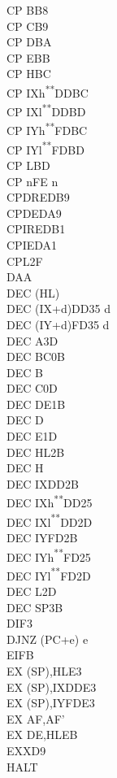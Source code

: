 \documentclass[twoside,openright,a4paper]{book}
\newcommand{\UNDOC}{\textnormal{\textsuperscript{**}}}
\begin{document}
\begin{multicols}{3}
{\begin{tabbing}
	CP B\>B8\\
	CP C\>B9\\
	CP D\>BA\\
	CP E\>BB\\
	CP H\>BC\\
	CP IXh\UNDOC\>DDBC\\
	CP IXl\UNDOC\>DDBD\\
	CP IYh\UNDOC\>FDBC\\
	CP IYl\UNDOC\>FDBD\\
	CP L\>BD\\
	CP n\>FE n\\
	CPDR\>EDB9\\
	CPD\>EDA9\\
	CPIR\>EDB1\\
	CPI\>EDA1\\
	CPL\>2F\\
	DAA\\
	DEC (HL)\\
	DEC (IX+d)\>DD35 d\\
	DEC (IY+d)\>FD35 d\\
	DEC A\>3D\\
	DEC BC\>0B\\
	DEC B\\
	DEC C\>0D\\
	DEC DE\>1B\\
	DEC D\\
	DEC E\>1D\\
	DEC HL\>2B\\
	DEC H\\
	DEC IX\>DD2B\\
	DEC IXh\UNDOC\>DD25\\
	DEC IXl\UNDOC\>DD2D\\
	DEC IY\>FD2B\\
	DEC IYh\UNDOC\>FD25\\
	DEC IYl\UNDOC\>FD2D\\
	DEC L\>2D\\
	DEC SP\>3B\\
	DI\>F3\\
	DJNZ (PC+e) e\\
	EI\>FB\\
	EX (SP),HL\>E3\\
	EX (SP),IX\>DDE3\\
	EX (SP),IY\>FDE3\\
	EX AF,AF'\\
	EX DE,HL\>EB\\
	EXX\>D9\\
	HALT\\

\end{tabbing}}
\end{multicols}
\end{document}

